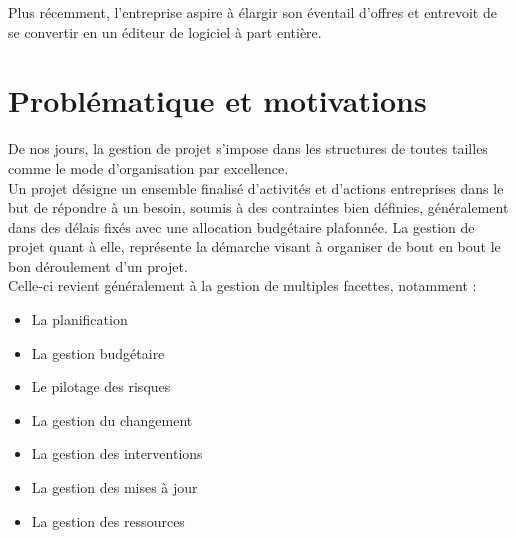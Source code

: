 \begin{spacing}{1.5}
Plus récemment, l'entreprise aspire à élargir son éventail d'offres et entrevoit de se convertir en un éditeur de logiciel à part entière.


\section{Problématique et motivations}
De nos jours, la gestion de projet s'impose dans les structures de toutes tailles comme le mode d'organisation par excellence.\\
Un projet désigne un ensemble finalisé d'activités et d'actions entreprises dans le but de répondre à un besoin, soumis à des contraintes bien définies, généralement dans des délais fixés avec une allocation budgétaire plafonnée. La gestion de projet quant à elle, représente la démarche visant à organiser de bout en bout le bon déroulement d'un projet.\\
Celle-ci revient généralement à la gestion de multiples facettes, notamment :
\begin{itemize}
\item La planification
    \item La gestion budgétaire
    \item Le pilotage des risques
    \item La gestion du changement
    \item La gestion des interventions
    \item La gestion des mises à jour
    \item La gestion des ressources
\end{itemize}
\


\end{spacing}
